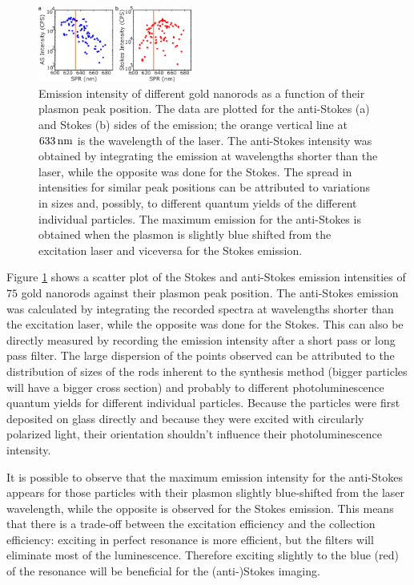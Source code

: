 \begin{figure}[htp] \centering
\includegraphics[width=0.45\textwidth]{Chapters/03_Background_Free/Figures/03_Intensity_SPR/Intensity_SPR.png}
\caption{Emission intensity of different gold nanorods as a function of their
plasmon peak position. The data are plotted for the anti-Stokes (a) and Stokes
(b) sides of the emission; the orange vertical line at $633\,\textrm{nm}$ is the
wavelength of the laser. The anti-Stokes intensity was obtained by
integrating the emission at wavelengths shorter than the laser, while the
opposite was done for the Stokes. The spread in intensities for similar peak
positions can be attributed to variations in sizes and, possibly, to different
quantum yields of the different individual particles. The maximum emission for
the anti-Stokes is obtained when the plasmon is slightly blue shifted from the
excitation laser and viceversa for the Stokes emission.}
	\label{fig:emission_peak_position}
\end{figure} 

Figure \ref{fig:emission_peak_position} shows a scatter plot of the Stokes and
anti-Stokes emission intensities of $75$ gold nanorods against their plasmon
peak position. The anti-Stokes emission was calculated by integrating
the recorded spectra at wavelengths shorter than the excitation laser, while the
opposite was done for the Stokes. This can also be directly measured by
recording the emission intensity after a short pass or long pass filter. The
large dispersion of the points observed can be attributed to the distribution of
sizes of the rods inherent to the synthesis method\cite{Zijlstra2011} (bigger
particles will have a bigger cross section) and probably to different
photoluminescence quantum yields for different individual particles. Because the
particles were first deposited on glass directly and because they were excited
with circularly polarized light, their orientation shouldn't influence their
photoluminescence intensity.

It is possible to observe that the maximum emission intensity for the
anti-Stokes appears for those particles with their plasmon slightly blue-shifted
from the laser wavelength, while the opposite is observed for the Stokes
emission. This means that there is a trade-off between the excitation efficiency
and the collection efficiency: exciting in perfect resonance is more efficient,
but the filters will eliminate most of the luminescence. Therefore exciting
slightly to the blue (red) of the resonance will be beneficial for the
(anti-)Stokes imaging. 

